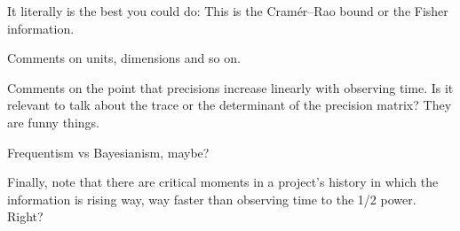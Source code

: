 \documentclass[10pt, letterpaper]{article}
\begin{document}
It literally is the best you could do:
This is the Cram\'er--Rao bound or the Fisher information.

Comments on units, dimensions and so on.

Comments on the point that precisions increase linearly with observing time.
Is it relevant to talk about the trace or the determinant of the precision
matrix? They are funny things.

Frequentism vs Bayesianism, maybe?

Finally, note that there are critical moments in a project's history in which
the information is rising way, way faster than observing time to the 1/2 power.
Right?

\clearmargin\clearpage\raggedright

\end{document}
